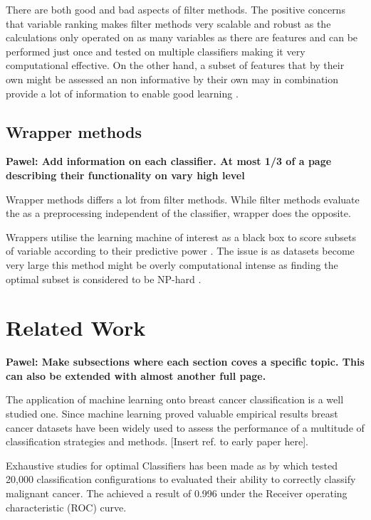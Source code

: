 There are both good and bad aspects of filter methods. The positive concerns that variable ranking makes filter methods very scalable and robust as the calculations only operated on as many variables as there are features and can be performed just once and tested on multiple classifiers making it very computational effective. On the other hand, a subset of features that by their own might be assessed an non informative by their own may in combination provide a lot of information to enable good learning \parencite{guyon2003}.


\subsection{Wrapper methods}

\textbf{ Pawel: Add information on each classifier. At most 1/3 of a page describing their functionality on  vary high level }

Wrapper methods differs a lot from filter methods. While filter methods evaluate the as a preprocessing independent of the classifier, wrapper does the opposite.

Wrappers utilise the learning machine of interest as a black box to score subsets of variable according to their predictive power \parencite{guyon2003}. The issue is as datasets become very large this method might be overly computational intense as finding the optimal subset is considered to be NP-hard \parencite{amaldi1998}.


\section{Related Work}

\textbf{ Pawel: Make subsections where each section coves a specific topic. This can also be extended with almost another full page.}

The application of machine learning onto breast cancer classification is a well studied one. Since machine learning proved valuable empirical results breast cancer datasets have been widely used to assess the performance of a multitude of classification strategies and methods. [Insert ref. to early paper here].

Exhaustive studies for optimal Classifiers has been made as by \parencite{ramos2012} which tested 20,000 classification configurations to evaluated their ability to correctly classify malignant cancer. The achieved a result of 0.996 under the Receiver operating characteristic (ROC) curve.

